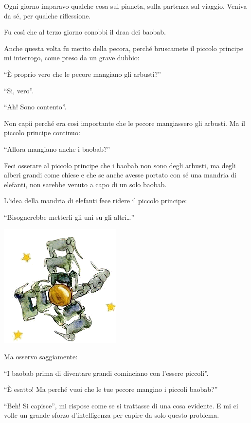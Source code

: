 \documentclass[11pt]{scrbook}
\begin{document}
Ogni giorno imparavo qualche cosa sul pianeta, sulla partenza sul
viaggio. Veniva da sé, per qualche riflessione.

Fu così che al terzo giorno conobbi il draa dei baobab.

Anche questa volta fu merito della pecora, perché bruscamete il piccolo
principe mi interrogo, come preso da un grave dubbio:

``È proprio vero che le pecore mangiano gli arbusti?''

``Si, vero''.

``Ah! Sono contento''.

Non capii perché era così importante che le pecore mangiassero gli
arbusti. Ma il piccolo principe continuo:

``Allora mangiano anche i baobab?''

Feci osserare al piccolo principe che i baobab non sono degli arbusti,
ma degli alberi grandi come chiese e che se anche avesse portato con sé
una mandria di elefanti, non sarebbe venuto a capo di un solo baobab.

L'idea della mandria di elefanti fece ridere il piccolo principe:

``Bisognerebbe metterli gli uni su gli altri\ldots{}''

\begin{center}
\includegraphics{./img/5a.png}

\end{center}

Ma osservo saggiamente:

``I baobab prima di diventare grandi cominciano con l'essere piccoli''.

``È esatto! Ma perché vuoi che le tue pecore mangino i piccoli baobab?''

``Beh! Si capisce'', mi rispose come se si trattasse di una cosa
evidente. E mi ci volle un grande sforzo d'intelligenza per capire da
solo questo problema.
\end{document}
